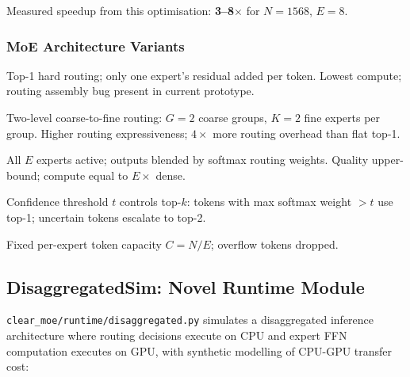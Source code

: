 \documentclass[12pt,a4paper]{article}
\begin{document}
Measured speedup from this optimisation: \textbf{3--8$\times$} for $N = 1568$, $E = 8$.

\subsubsection{MoE Architecture Variants}

\begin{description}[leftmargin=1.5em]
\item[Hard CLEAR-MoE] Top-1 hard routing; only one expert's residual added per token. Lowest compute; routing assembly bug present in current prototype.
\item[H-MoE (Hierarchical)] Two-level coarse-to-fine routing: $G = 2$ coarse groups, $K = 2$ fine experts per group. Higher routing expressiveness; $4\times$ more routing overhead than flat top-1.
\item[Soft-MoE] All $E$ experts active; outputs blended by softmax routing weights. Quality upper-bound; compute equal to $E\times$ dense.
\item[Elastic-MoE] Confidence threshold $t$ controls top-$k$: tokens with max softmax weight $> t$ use top-1; uncertain tokens escalate to top-2.
\item[Capacity-MoE] Fixed per-expert token capacity $C = N/E$; overflow tokens dropped.
\end{description}

\subsection{DisaggregatedSim: Novel Runtime Module}

\texttt{clear\_moe/runtime/disaggregated.py} simulates a disaggregated inference architecture where routing decisions execute on CPU and expert FFN computation executes on GPU, with synthetic modelling of CPU-GPU transfer cost:
\end{document}

